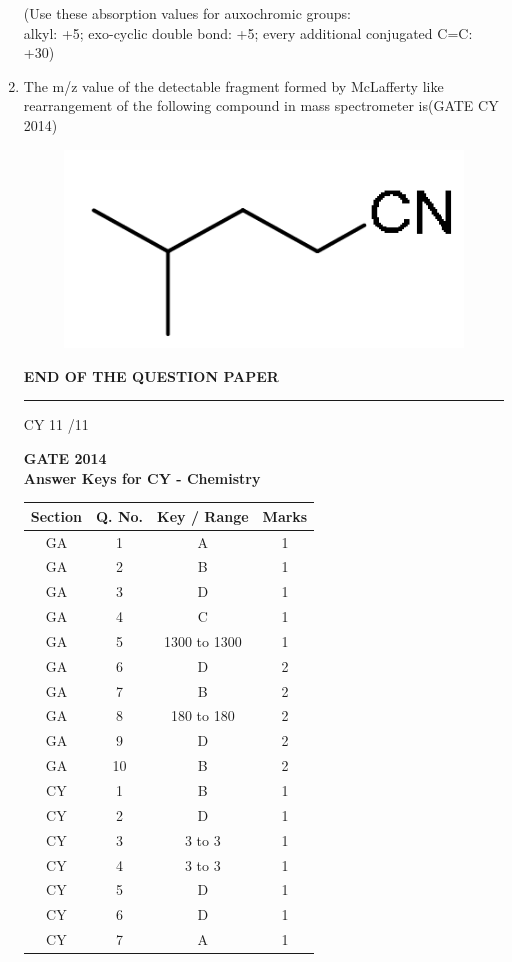 \documentclass[a4paper,10pt]{exam}
\theoremstyle{remark}
\begin{document}
\begin{enumerate}
\begin{figure}[H]
    \caption{}
    \label{fig:placeholder}
\end{figure}
(Use these absorption values for auxochromic groups: \\
alkyl: +5; exo-cyclic double bond: +5; every additional conjugated C=C: +30) 
\item The m/z value of the detectable fragment formed by McLafferty like rearrangement of the following 
compound in mass spectrometer is\hfill{(GATE CY 2014)}
\begin{figure}[H]
    \centering
    \includegraphics[width=0.3\columnwidth]{figs/Q 55.png}
    \caption{}
    \label{fig:placeholder}
\end{figure}
\begin{center}
    \textbf{END OF THE QUESTION PAPER }
\end{center}
\vfill
\noindent\rule{\linewidth}{0.4pt}
CY \hfill 11 /11
\newpage
\begin{center}
    \textbf{GATE 2014\\ Answer Keys for CY - Chemistry}
\end{center}
\noindent
\begin{minipage}{0.49\textwidth}
\begin{tabular}{|c|c|c|c|}
\hline
Section & Q. No. & Key / Range & Marks \\
\hline
GA & 1 & A & 1 \\
GA & 2 & B & 1 \\
GA & 3 & D & 1 \\
GA & 4 & C & 1 \\
GA & 5 & 1300 to 1300 & 1 \\
GA & 6 & D & 2 \\
GA & 7 & B & 2 \\
GA & 8 & 180 to 180 & 2 \\
GA & 9 & D & 2 \\
GA & 10 & B & 2 \\
CY & 1 & B & 1 \\
CY & 2 & D & 1 \\
CY & 3 & 3 to 3 & 1 \\
CY & 4 & 3 to 3 & 1 \\
CY & 5 & D & 1 \\
CY & 6 & D & 1 \\
CY & 7 & A & 1 \\

\end{tabular}
\end{minipage}
\end{enumerate}
\end{document}
